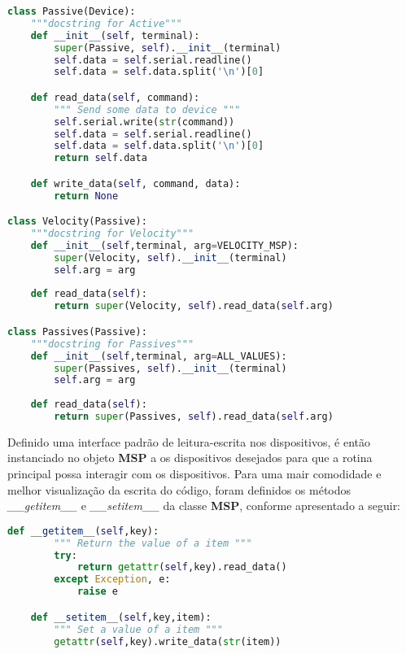 \begin{lstlisting}[language=Python,caption={Declaração de classes fundamentais no script Python},label=trecho_device_py]
class Passive(Device):
    """docstring for Active"""
    def __init__(self, terminal):
        super(Passive, self).__init__(terminal)
        self.data = self.serial.readline()
        self.data = self.data.split('\n')[0]

    def read_data(self, command):
        """ Send some data to device """
        self.serial.write(str(command))
        self.data = self.serial.readline()
        self.data = self.data.split('\n')[0]
        return self.data

    def write_data(self, command, data):
        return None

class Velocity(Passive):
    """docstring for Velocity"""
    def __init__(self,terminal, arg=VELOCITY_MSP):
        super(Velocity, self).__init__(terminal)
        self.arg = arg
        
    def read_data(self):
        return super(Velocity, self).read_data(self.arg)

class Passives(Passive):
    """docstring for Passives"""
    def __init__(self,terminal, arg=ALL_VALUES):
        super(Passives, self).__init__(terminal)
        self.arg = arg
        
    def read_data(self):
        return super(Passives, self).read_data(self.arg)
\end{lstlisting}

Definido uma interface padrão de leitura-escrita nos dispositivos, é então instanciado no objeto \textbf{MSP} a os dispositivos desejados para que a rotina principal possa interagir com os dispositivos. Para uma mair comodidade e melhor visualização da escrita do código, foram definidos os métodos \textit{\_\_getitem\_\_} e \textit{\_\_setitem\_\_} da classe \textbf{MSP}, conforme apresentado a seguir:

\begin{lstlisting}[language=Python,caption={Declaração dos métodos de leitura e escrita de item},label=trecho_item_py]
    def __getitem__(self,key):
        """ Return the value of a item """
        try:
            return getattr(self,key).read_data()
        except Exception, e:
            raise e

    def __setitem__(self,key,item):
        """ Set a value of a item """
        getattr(self,key).write_data(str(item))
\end{lstlisting}

